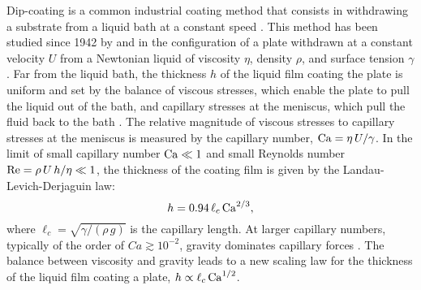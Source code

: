 \documentclass{jfm}
\begin{document}
Dip-coating is a common industrial coating method that consists in withdrawing a substrate from a liquid bath at a constant speed \cite[][]{scriven1988physics,ruschak1985coating,quere1999fluid,grosso2011exploit}. This method has been studied since 1942 by  \cite{levich1942dragging} and  \cite{derjaguin1943} in the configuration of a plate withdrawn at a constant velocity $U$ from a Newtonian liquid of viscosity $\eta$, density $\rho$, and surface tension $\gamma$. Far from the liquid bath, the thickness $h$ of the liquid film coating the plate is uniform and set by the balance of viscous stresses, which enable the plate to pull the liquid out of the bath, and capillary stresses at the meniscus, which pull the fluid back to the bath \cite[][]{rio2017withdrawing}. The relative magnitude of viscous stresses to capillary stresses at the meniscus is measured by the capillary number, ${\rm Ca}=\eta\,U/\gamma$. In the limit of small capillary number ${\rm Ca} \ll 1$ and small Reynolds number ${\rm Re} =\rho\,U\,h/\eta \ll 1$, the thickness of the coating film is given by the Landau-Levich-Derjaguin law:
\begin{equation} \label{eq:LLD}
h=0.94\,\ell_c\,{\rm Ca}^{2/3},
\end{equation}
where $\ell_c=\sqrt{\gamma/(\rho\,g)}$ is the capillary length. At larger capillary numbers, typically of the order of $Ca \gtrsim 10^{-2}$, gravity dominates capillary forces \cite[][]{maleki2011landau}. The balance between viscosity and gravity leads to a new scaling law for the thickness of the liquid film coating a plate, $h \propto \ell_c\,{\rm Ca}^{1/2}$. 
\end{document}
